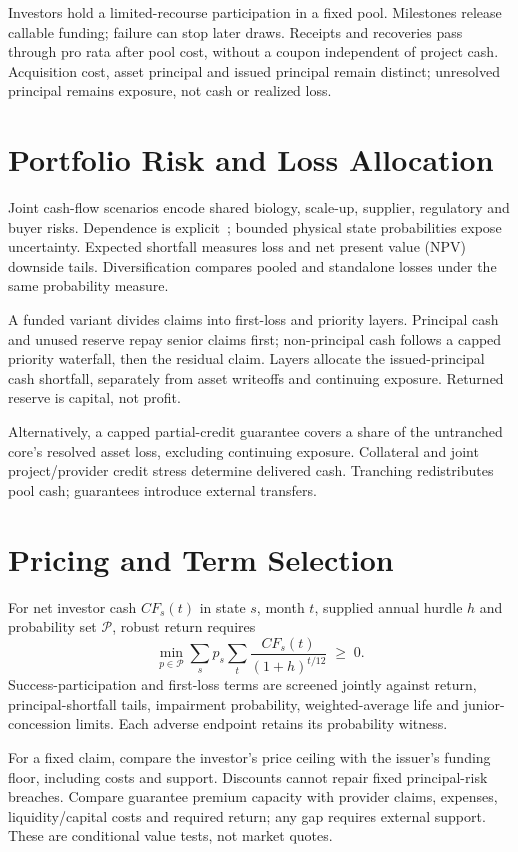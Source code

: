 Investors hold a limited-recourse participation in a fixed pool. Milestones
release callable funding; failure can stop later draws. Receipts and recoveries
pass through pro rata after pool cost, without a coupon independent of project
cash. Acquisition cost, asset principal and issued principal remain distinct;
unresolved principal remains exposure, not cash or realized loss.

\section{Portfolio Risk and Loss Allocation}
Joint cash-flow scenarios encode shared biology, scale-up, supplier, regulatory
and buyer risks. Dependence is explicit~\cite{hull2019longshots}; bounded
physical state probabilities expose uncertainty. Expected shortfall measures
loss and net present value (NPV) downside tails. Diversification compares pooled and standalone losses
under the same probability measure.

A funded variant divides claims into first-loss and priority layers.
Principal cash and unused reserve repay senior claims first; non-principal
cash follows a capped priority waterfall, then the residual claim. Layers
allocate the issued-principal cash shortfall, separately from asset writeoffs
and continuing exposure. Returned reserve is capital, not profit.

Alternatively, a capped partial-credit guarantee covers a share of the
untranched core's resolved asset loss, excluding continuing exposure.
Collateral and joint project/provider credit stress determine delivered cash.
Tranching redistributes pool cash; guarantees introduce external transfers.

\section{Pricing and Term Selection}
For net investor cash \(CF_s(t)\) in state \(s\), month \(t\), supplied annual
hurdle \(h\) and probability set \(\mathcal P\), robust return requires
\begin{equation*}
\min_{p\in\mathcal P}\sum_s p_s\sum_t
\frac{CF_s(t)}{(1+h)^{t/12}}\;\geq\;0.
\end{equation*}
Success-participation and first-loss terms are screened jointly against return,
principal-shortfall tails, impairment probability, weighted-average life and
junior-concession limits. Each adverse endpoint retains its probability witness.

For a fixed claim, compare the investor's price ceiling with the issuer's
funding floor, including costs and support. Discounts cannot repair fixed
principal-risk breaches. Compare guarantee premium capacity with provider
claims, expenses, liquidity/capital costs and required return; any gap requires
external support. These are conditional value tests, not market quotes.

